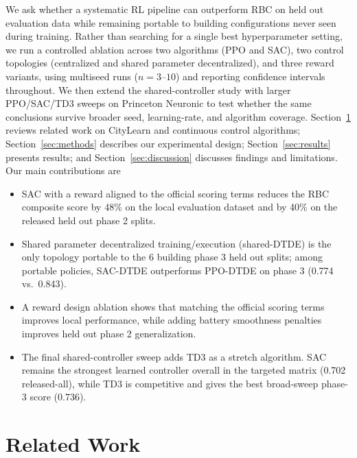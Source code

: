 \documentclass{article}
\begin{document}
We ask whether a systematic RL pipeline can outperform RBC on held out evaluation data while remaining portable to building configurations never seen during training. Rather than searching for a single best hyperparameter setting, we run a controlled ablation across two algorithms (PPO and SAC), two control topologies (centralized and shared parameter decentralized), and three reward variants, using multiseed runs ($n = 3$--$10$) and reporting confidence intervals throughout. We then extend the shared-controller study with larger PPO/SAC/TD3 sweeps on Princeton Neuronic to test whether the same conclusions survive broader seed, learning-rate, and algorithm coverage. Section~\ref{sec:related} reviews related work on CityLearn and continuous control algorithms; Section~\ref{sec:methods} describes our experimental design; Section~\ref{sec:results} presents results; and Section~\ref{sec:discussion} discusses findings and limitations. Our main contributions are

\begin{itemize}
    \item SAC with a reward aligned to the official scoring terms reduces the RBC composite score by 48\% on the local evaluation dataset and by 40\% on the released held out phase 2 splits.
    \item Shared parameter decentralized training/execution (shared-DTDE) is the only topology portable to the 6 building phase 3 held out splits; among portable policies, SAC-DTDE outperforms PPO-DTDE on phase 3 (0.774 vs.\ 0.843).
    \item A reward design ablation shows that matching the official scoring terms improves local performance, while adding battery smoothness penalties improves held out phase 2 generalization.
    \item The final shared-controller sweep adds TD3 as a stretch algorithm. SAC remains the strongest learned controller overall in the targeted matrix (0.702 released-all), while TD3 is competitive and gives the best broad-sweep phase-3 score (0.736).
\end{itemize}

\section{Related Work}\label{sec:related}
\end{document}
